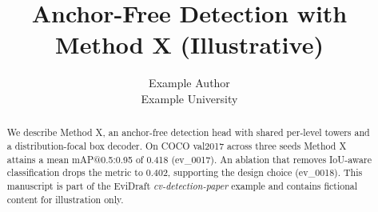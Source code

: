 \documentclass[10pt]{article}
\title{Anchor-Free Detection with Method X (Illustrative)}
\author{Example Author\\ Example University}
\date{}
\begin{document}
\maketitle

\begin{abstract}
We describe Method X, an anchor-free detection head with shared per-level
towers and a distribution-focal box decoder. On COCO val2017 across three
seeds Method X attains a mean mAP@0.5:0.95 of 0.418
(ev\_0017). An ablation that removes IoU-aware classification drops the
metric to 0.402, supporting the design choice (ev\_0018). This manuscript
is part of the EviDraft \emph{cv-detection-paper} example and contains
fictional content for illustration only.
\end{abstract}








\end{document}
